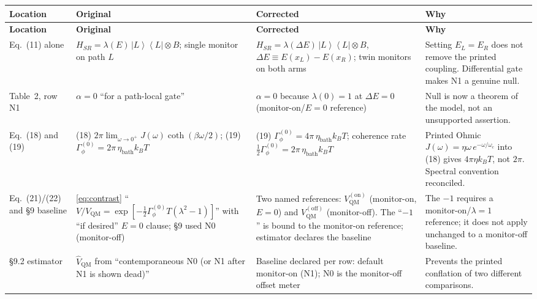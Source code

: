 \documentclass[11pt]{article}
\newcommand{\ket}[1]{\left|{#1}\right\rangle}
\newcommand{\bra}[1]{\left\langle{#1}\right|}
\newcommand{\LR}{\ket{L}\!\bra{L}}
\begin{document}
\begin{longtable}{p{0.9in}p{2.35in}p{2.35in}p{2.35in}}
\hline
\textbf{Location} & \textbf{Original} & \textbf{Corrected} & \textbf{Why}\\
\hline
\endfirsthead
\hline
\textbf{Location} & \textbf{Original} & \textbf{Corrected} & \textbf{Why}\\
\hline
\endhead

Eq.~(11) alone &
\hspace*{-3pt}$H_{SR} = \lambda(E)\,\LR \otimes B$; single monitor on path $L$ &
\hspace*{-3pt}$H_{SR} = \lambda(\Delta E)\,\LR \otimes B$, $\Delta E \equiv E(x_L)-E(x_R)$; twin monitors on both arms &
Setting $E_L=E_R$ does not remove the printed coupling. Differential gate makes N1 a genuine null.\\

Table~2, row N1 &
$\alpha = 0$ ``for a path-local gate'' &
$\alpha = 0$ because $\lambda(0)=1$ at $\Delta E=0$ (monitor-on/$E{=}0$ reference) &
Null is now a theorem of the model, not an unsupported assertion.\\

Eq.~(18) and (19) &
(18) $2\pi\lim_{\omega\to0^+} J(\omega)\coth(\beta\omega/2)$; (19) $\Gamma_\phi^{(0)} = 2\pi\,\eta_{\mathrm{bath}}k_BT$ &
(19) $\Gamma_\phi^{(0)} = 4\pi\,\eta_{\mathrm{bath}}k_BT$; coherence rate $\tfrac12\Gamma_\phi^{(0)}=2\pi\,\eta_{\mathrm{bath}}k_BT$ &
Printed Ohmic $J(\omega){=}\eta\omega\,e^{-\omega/\omega_c}$ into (18) gives $4\pi\eta k_BT$, not $2\pi$. Spectral convention reconciled.\\

Eq.~(21)/(22) and \S9 baseline &
\eqref{eq:contrast} ``$V/V_{\mathrm{QM}}=\exp[-\tfrac12\Gamma_\phi^{(0)}T(\lambda^2-1)]$'' with ``if desired'' $E{=}0$ clause; \S9 used N0 (monitor-off) &
Two named references: $V_{\mathrm{QM}}^{\mathrm{(on)}}$ (monitor-on, $E{=}0$) and $V_{\mathrm{QM}}^{\mathrm{(off)}}$ (monitor-off). The ``$-1$'' is bound to the monitor-on reference; estimator declares the baseline &
The $-1$ requires a monitor-on/$\lambda{=}1$ reference; it does not apply unchanged to a monitor-off baseline.\\

\S9.2 estimator &
$\hat V_{\mathrm{QM}}$ from ``contemporaneous N0 (or N1 after N1 is shown dead)'' &
Baseline declared per row: default monitor-on (N1); N0 is the monitor-off offset meter &
Prevents the printed conflation of two different comparisons.\\


\end{longtable}
\end{document}
